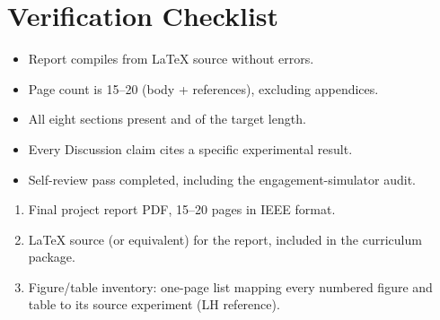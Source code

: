 \documentclass[11pt,letterpaper]{article}
\begin{document}
\section{Verification Checklist}
\begin{itemize}[leftmargin=2em]
	\item[$\square$] Report compiles from LaTeX source without errors.
	\item[$\square$] Page count is 15--20 (body + references), excluding appendices.
	\item[$\square$] All eight sections present and of the target length.
	\item[$\square$] Every Discussion claim cites a specific experimental result.
	\item[$\square$] Self-review pass completed, including the engagement-simulator audit.
\end{itemize}

\begin{tcolorbox}[deliverable={Lab Handout 5-G Deliverable}]
	\begin{enumerate}[leftmargin=1.2em]
		\item Final project report PDF, 15--20 pages in IEEE format.
		\item LaTeX source (or equivalent) for the report, included in the curriculum package.
		\item Figure/table inventory: one-page list mapping every numbered figure and table to its source experiment (LH reference).
	\end{enumerate}
\end{tcolorbox}

\printhandoutglossary
\end{document}
